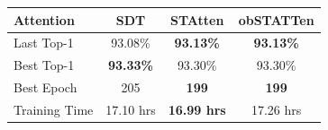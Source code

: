 \documentclass[../main.tex]{subfiles}
\begin{document}
\begin{tabular}{lccc}\toprule

Attention &SDT &STAtten &obSTATTen\\\midrule

Last Top-1	& 93.08\%	& \textbf{93.13\%}	&\textbf{93.13\%}\\
Best Top-1	& \textbf{93.33\%}	& 93.30\%	&93.30\%\\
Best Epoch	& 205		& \textbf{199}		& \textbf{199}	\\
Training Time & 17.10 hrs & \textbf{16.99 hrs} & 17.26 hrs  \\\bottomrule

\end{tabular}
\end{document}
